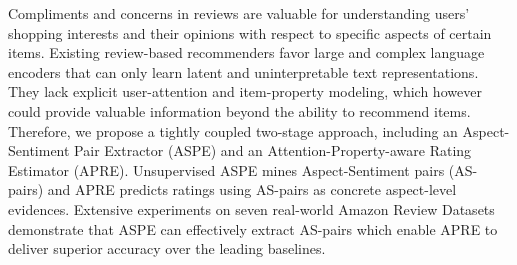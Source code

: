 Compliments and concerns in reviews are valuable for understanding users' shopping interests and their opinions with respect to specific aspects of certain items. Existing review-based recommenders favor large and complex language encoders that can only learn latent and uninterpretable text representations. They lack explicit user-attention and item-property modeling, which however could provide valuable information beyond the ability to recommend items. Therefore, we propose a tightly coupled two-stage approach, including an Aspect-Sentiment Pair Extractor (ASPE) and an Attention-Property-aware Rating Estimator (APRE). Unsupervised ASPE mines Aspect-Sentiment pairs (AS-pairs) and APRE predicts ratings using AS-pairs as concrete aspect-level evidences. Extensive experiments on seven real-world Amazon Review Datasets demonstrate that ASPE can effectively extract AS-pairs which enable APRE to deliver superior accuracy over the leading baselines.
